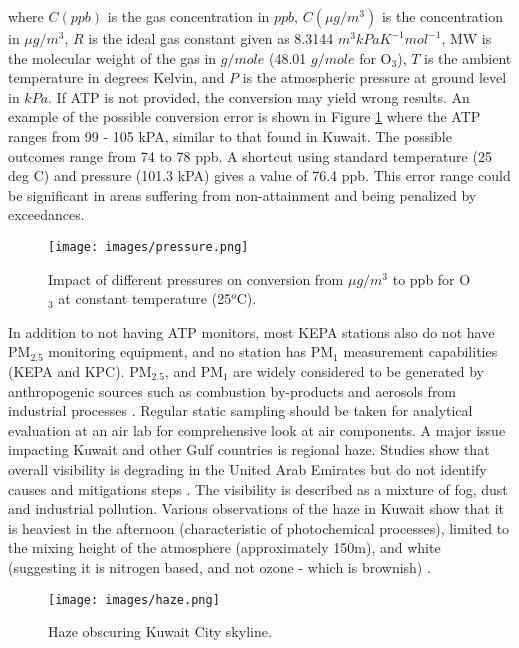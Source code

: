 \noindent
where $C(ppb)$ is the gas concentration in $ppb$, $C(\mu g/m^{3})$ is the concentration in $\mu g/m^{3}$, $R$ is the ideal gas constant given as 8.3144 $m^{3}kPa K^{-1}mol^{-1}$, MW is the molecular weight of the gas in $g/mole$ (48.01 $g/mole$ for O$_{3}$), $T$ is the ambient temperature in degrees Kelvin, and $P$ is the atmospheric pressure at ground level in $kPa$.  If ATP is not provided, the conversion may yield wrong results. An example of the possible conversion error is shown in Figure \ref{fig:pressure} where the ATP ranges from 99 - 105 kPA, similar to that found in Kuwait. The possible outcomes range from 74 to 78 ppb. A shortcut using standard temperature (25 deg C) and pressure (101.3 kPA) gives a value of 76.4 ppb. This error range could be significant in areas suffering from non-attainment and being penalized by exceedances. 
%
\begin{figure}[H]
\centering
\texttt{[image: images/pressure.png]} 
\caption[Impact of different pressures on air concentration conversion at constant temperature.]{Impact of different pressures on conversion from $\mu g/m^{3}$ to ppb for O$_{3}$ at constant temperature (25$^{o}$C).}
\label{fig:pressure}
\end{figure}
%
In addition to not having ATP monitors, most KEPA stations also do not have PM$_{2.5}$ monitoring equipment, and no station has PM$_{1}$ measurement capabilities (KEPA and KPC). PM$_{2.5}$, and PM$_{1}$ are widely considered to be generated by anthropogenic sources such as combustion by-products and aerosols from industrial processes \cite{Squizzato2016}.  Regular static sampling should be taken for analytical evaluation at an air lab for comprehensive look at air components. A major issue impacting Kuwait and other Gulf countries is regional haze. Studies show that overall visibility is degrading in the United Arab Emirates but do not identify causes and mitigations steps \citep{Amal2017}. The visibility is described as a mixture of fog, dust and industrial pollution. Various observations of the haze in Kuwait show that it is heaviest in the afternoon (characteristic of photochemical processes), limited to the mixing height of the atmosphere (approximately 150m), and white (suggesting it is nitrogen based, and not ozone - which is brownish) \citep{Liu2013}.
%
\begin{figure}[H]
\centering
\texttt{[image: images/haze.png]} 
\caption{Haze obscuring Kuwait City skyline.}
\label{fig:haze}
\end{figure}
%

